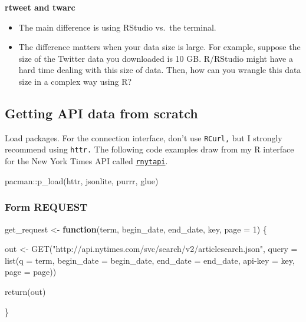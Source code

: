 \documentclass[
]{book}
\newenvironment{Shaded}{\begin{snugshade}}{\end{snugshade}}
\newcommand{\AttributeTok}[1]{\textcolor[rgb]{0.77,0.63,0.00}{#1}}
\newcommand{\ControlFlowTok}[1]{\textcolor[rgb]{0.13,0.29,0.53}{\textbf{#1}}}
\newcommand{\DecValTok}[1]{\textcolor[rgb]{0.00,0.00,0.81}{#1}}
\newcommand{\FunctionTok}[1]{\textcolor[rgb]{0.00,0.00,0.00}{#1}}
\newcommand{\NormalTok}[1]{#1}
\newcommand{\OtherTok}[1]{\textcolor[rgb]{0.56,0.35,0.01}{#1}}
\newcommand{\SpecialCharTok}[1]{\textcolor[rgb]{0.00,0.00,0.00}{#1}}
\newcommand{\StringTok}[1]{\textcolor[rgb]{0.31,0.60,0.02}{#1}}
\begin{document}
\textbf{rtweet and twarc}

\begin{itemize}
\item
  The main difference is using RStudio vs.~the terminal.
\item
  The difference matters when your data size is large. For example, suppose the size of the Twitter data you downloaded is 10 GB. R/RStudio might have a hard time dealing with this size of data. Then, how can you wrangle this data size in a complex way using R?
\end{itemize}

\hypertarget{getting-api-data-from-scratch}{%
\subsection{Getting API data from scratch}\label{getting-api-data-from-scratch}}

Load packages. For the connection interface, don't use \texttt{RCurl,} but I strongly recommend using \texttt{httr.} The following code examples draw from my R interface for the New York Times API called \href{https://jaeyk.github.io/rnytapi/}{\texttt{rnytapi}}.

\begin{Shaded}
\begin{Highlighting}[]
\NormalTok{pacman}\SpecialCharTok{::}\FunctionTok{p\_load}\NormalTok{(httr, jsonlite, purrr, glue)}
\end{Highlighting}
\end{Shaded}

\hypertarget{form-request}{%
\subsubsection{Form REQUEST}\label{form-request}}

\begin{Shaded}
\begin{Highlighting}[]
\NormalTok{get\_request }\OtherTok{\textless{}{-}} \ControlFlowTok{function}\NormalTok{(term, begin\_date, end\_date, key, }\AttributeTok{page =} \DecValTok{1}\NormalTok{) \{}

\NormalTok{    out }\OtherTok{\textless{}{-}} \FunctionTok{GET}\NormalTok{(}\StringTok{"http://api.nytimes.com/svc/search/v2/articlesearch.json"}\NormalTok{,}
        \AttributeTok{query =} \FunctionTok{list}\NormalTok{(}\StringTok{\textquotesingle{}q\textquotesingle{}} \OtherTok{=}\NormalTok{ term,}
                     \StringTok{\textquotesingle{}begin\_date\textquotesingle{}} \OtherTok{=}\NormalTok{ begin\_date,}
                     \StringTok{\textquotesingle{}end\_date\textquotesingle{}} \OtherTok{=}\NormalTok{ end\_date,}
                     \StringTok{\textquotesingle{}api{-}key\textquotesingle{}} \OtherTok{=}\NormalTok{ key,}
                     \StringTok{\textquotesingle{}page\textquotesingle{}} \OtherTok{=}\NormalTok{ page))}

    \FunctionTok{return}\NormalTok{(out)}

\NormalTok{\}}
\end{Highlighting}
\end{Shaded}
\end{document}
